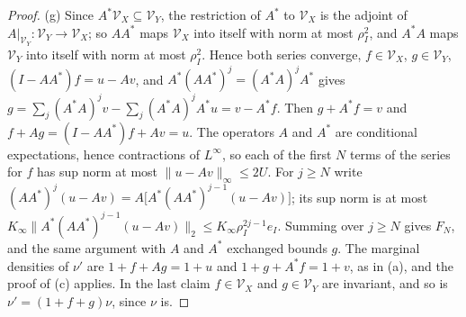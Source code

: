 \begin{proof}
(g) Since $A^*\mathcal V_X\subseteq\mathcal V_Y$, the restriction of $A^*$ to
$\mathcal V_X$ is the adjoint of $A|_{\mathcal V_Y}\colon\mathcal V_Y\to\mathcal V_X$;
so $AA^*$ maps $\mathcal V_X$ into itself with norm at most $\rho_I^2$, and
$A^*A$ maps $\mathcal V_Y$ into itself with norm at most $\rho_I^2$. Hence both
series converge, $f\in\mathcal V_X$, $g\in\mathcal V_Y$, $(I-AA^*)f=u-Av$, and
$A^*(AA^*)^j=(A^*A)^jA^*$ gives $g=\sum_j(A^*A)^jv-\sum_j(A^*A)^jA^*u=v-A^*f$.
Then $g+A^*f=v$ and $f+Ag=(I-AA^*)f+Av=u$. The operators $A$ and $A^*$ are
conditional expectations, hence contractions of $L^\infty$, so each of the first
$N$ terms of the series for $f$ has sup norm at most $\|u-Av\|_\infty\le2U$. For
$j\ge N$ write $(AA^*)^j(u-Av)=A\bigl[A^*(AA^*)^{j-1}(u-Av)\bigr]$; its sup norm
is at most $K_\infty\|A^*(AA^*)^{j-1}(u-Av)\|_2\le K_\infty\rho_I^{2j-1}e_I$. Summing
over $j\ge N$ gives $F_N$, and the same argument with $A$ and $A^*$ exchanged
bounds $g$. The marginal densities of $\nu'$ are $1+f+Ag=1+u$ and
$1+g+A^*f=1+v$, as in (a), and the proof of (c) applies. In the last claim
$f\in\mathcal V_X$ and $g\in\mathcal V_Y$ are invariant, and so is
$\nu'=(1+f+g)\nu$, since $\nu$ is.
\end{proof}

